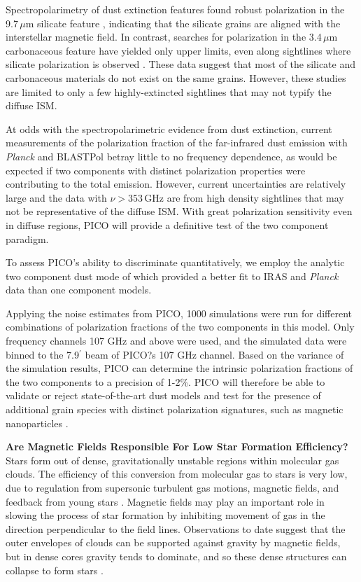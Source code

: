 \documentclass[PICOReport.tex]{subfiles}
\begin{document}
Spectropolarimetry of dust extinction features found robust polarization in the 9.7\,$\mu$m silicate feature \citep[e.g.,][]{Smith2000}, indicating that the silicate grains are aligned with the interstellar magnetic field. In contrast, searches for polarization in the 3.4\,$\mu$m carbonaceous feature have yielded only upper limits, even along sightlines where silicate polarization is observed \citep{Chiar2006,Mason2007}. These data suggest that most of the silicate and carbonaceous materials do not exist on the same grains. However, these studies are limited to only a few highly-extincted sightlines that may not typify the diffuse ISM.

At odds with the spectropolarimetric evidence from dust extinction, current measurements of the polarization fraction of the far-infrared dust emission with {\it Planck} \citep{Planck_Int_XXII} and BLASTPol \citep{Ashton2018} betray little to no frequency dependence, as would be expected if two components with distinct polarization properties were contributing to the total emission. However, current uncertainties are relatively large and the data with $\nu > 353\,$GHz are from high density sightlines that may not be representative of the diffuse ISM. With great polarization sensitivity even in diffuse regions, PICO will provide a definitive test of the two component paradigm.

To assess PICO's ability to discriminate quantitatively, we employ the analytic two component dust mode of \cite{Meisner2015} which provided a better fit to IRAS and {\it Planck} data than one component models. 

Applying the noise estimates from PICO, 1000 simulations were run for different combinations of polarization fractions of the two components in this model. Only frequency channels 107 GHz and above were used, and the simulated data were binned to the 7.9$^\prime$ beam of PICO?s 107 GHz channel. Based on the variance of the simulation results, PICO can determine the intrinsic polarization fractions of the two components to a precision of 1-2\%. PICO will therefore be able to validate or reject state-of-the-art dust models \citep[e.g.][Hensley \& Draine, in prep]{Guillet2018} and test for the presence of additional grain species with distinct polarization signatures, such as magnetic nanoparticles \citep{Draine2013}.


{\bf Are Magnetic Fields Responsible For Low Star Formation Efficiency?}\\
Stars form out of dense, gravitationally unstable regions within molecular gas clouds. The efficiency of this conversion from molecular gas to stars is very low, due to regulation from supersonic turbulent gas motions, magnetic fields, and feedback from young stars \citep{McKee2007}. 
Magnetic fields may play an important role in slowing the process of star formation by inhibiting movement of gas in the direction perpendicular to the field lines.  Observations to date suggest that the outer envelopes of clouds can be supported against gravity by magnetic fields, but in dense cores gravity tends to dominate, and so these dense structures can collapse to form stars \citep{Crutcher2010}.
\end{document}
